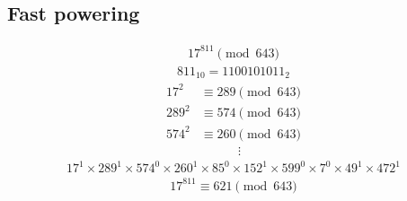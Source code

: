 \documentclass{article}
\begin{document}
\begin{multicols*}{2}
\subsection*{Fast powering}
\begin{align*}
    17^{811} \pmod{643}
\end{align*}
\begin{align*}
    811_{10} = 1100101011_2
\end{align*}
\begin{align*}
    17^2 &\equiv 289 \pmod{643} \\
    289^2 &\equiv 574 \pmod{643} \\
    574^2 &\equiv 260 \pmod{643} \\
    & \qquad \quad \vdots
\end{align*}
\begin{align*}
    17^{1} \times 289^{1} \times 574^{0} \times 260^{1} \times 85^{0} \times 152^{1} \times 599^{0} \times 7^{0} \times 49^{1} \times 472^{1}
\end{align*}
\begin{align*}
    17^{811} \equiv 621 \pmod{643}
\end{align*}

\end{multicols*}
\pagebreak
\end{document}
